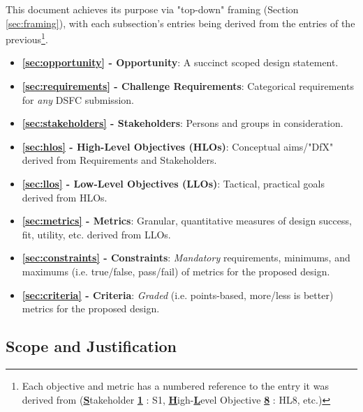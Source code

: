 \documentclass{../tex/report}
\begin{document}
This document achieves its purpose via "top-down" framing (Section \ref{sec:framing}), with each subsection's entries being derived from the entries of the
previous\footnote{Each objective and metric has a numbered reference to the entry it was derived from (\uline{\textbf{S}}takeholder \uline{\textbf{1}} : S1, \uline{\textbf{H}}igh-\uline{\textbf{L}}evel Objective \uline{\textbf{8}} : HL8, etc.)}.

\begin{itemize}
    \item \textbf{\ref{sec:opportunity} - Opportunity}: A succinct scoped design statement.
    \item \textbf{\ref{sec:requirements} - Challenge Requirements}: Categorical requirements for \textit{any} DSFC submission.
    \item \textbf{\ref{sec:stakeholders} - Stakeholders}: Persons and groups in consideration.
    \item \textbf{\ref{sec:hlos} - High-Level Objectives (HLOs)}: Conceptual aims/"DfX" derived from Requirements and Stakeholders.
    \item \textbf{\ref{sec:llos} - Low-Level Objectives (LLOs)}: Tactical, practical goals derived from HLOs.
    \item \textbf{\ref{sec:metrics} - Metrics}: Granular, quantitative measures of design success, fit, utility, etc. derived from LLOs.
    \item \textbf{\ref{sec:constraints} - Constraints}: \textit{Mandatory} requirements, minimums, and maximums (i.e. true/false, pass/fail) of metrics for the proposed design.
    \item \textbf{\ref{sec:criteria} - Criteria}: \textit{Graded} (i.e. points-based, more/less is better) metrics for the proposed design.
\end{itemize} 

\clearpage
\subsection{Scope and Justification}
\label{sec:scope}
\end{document}
